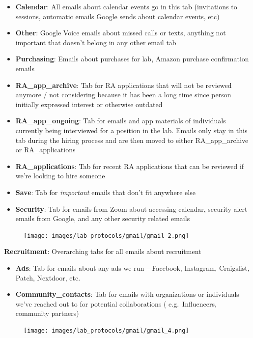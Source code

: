 \documentclass[
]{book}
\begin{document}
\begin{itemize}
\item
  \textbf{Calendar}: All emails about calendar events go in this tab (invitations to sessions, automatic emails Google sends about calendar events, etc)
\item
  \textbf{Other}: Google Voice emails about missed calls or texts, anything not important that doesn't belong in any other email tab
\item
  \textbf{Purchasing}: Emails about purchases for lab, Amazon purchase confirmation emails
\item
  \textbf{RA\_app\_archive}: Tab for RA applications that will not be reviewed anymore / not considering because it has been a long time since person initially expressed interest or otherwise outdated
\item
  \textbf{RA\_app\_ongoing}: Tab for emails and app materials of individuals currently being interviewed for a position in the lab. Emails only stay in this tab during the hiring process and are then moved to either RA\_app\_archive or RA\_applications
\item
  \textbf{RA\_applications}: Tab for recent RA applications that can be reviewed if we're looking to hire someone
\item
  \textbf{Save}: Tab for \emph{important} emails that don't fit anywhere else
\item
  \textbf{Security}: Tab for emails from Zoom about accessing calendar, security alert emails from Google, and any other security related emails
\end{itemize}

\begin{figure}
\centering
\texttt{[image: images/lab\_protocols/gmail/gmail\_2.png]}
\caption{}
\end{figure}

\textbf{Recruitment}: Overarching tabs for all emails about recruitment

\begin{itemize}
\item
  \textbf{Ads}: Tab for emails about any ads we run -- Facebook, Instagram, Craigslist, Patch, Nextdoor, etc.
\item
  \textbf{Community\_contacts}: Tab for emails with organizations or individuals we've reached out to for potential collaborations ( e.g.~Influencers, community partners)
\end{itemize}

\begin{figure}
\centering
\texttt{[image: images/lab\_protocols/gmail/gmail\_4.png]}
\caption{}
\end{figure}
\end{document}
